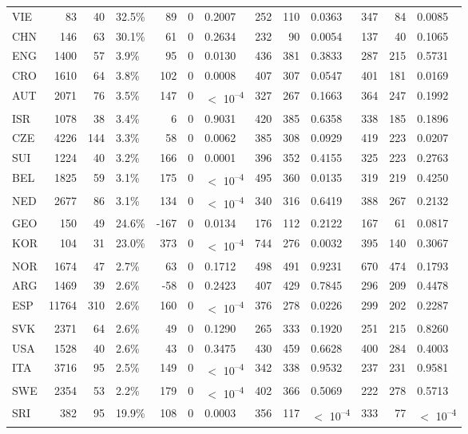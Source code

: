 \begin{tabular}[t]{lrrlrrlrrlrrl}
VIE & 83 & 40 & 32.5\% & 89 & 0 & 0.2007 & 252 & 110 & 0.0363 & 347 & 84 & 0.0085\\
CHN & 146 & 63 & 30.1\% & 61 & 0 & 0.2634 & 232 & 90 & 0.0054 & 137 & 40 & 0.1065\\
ENG & 1400 & 57 & 3.9\% & 95 & 0 & 0.0130 & 436 & 381 & 0.3833 & 287 & 215 & 0.5731\\
CRO & 1610 & 64 & 3.8\% & 102 & 0 & 0.0008 & 407 & 307 & 0.0547 & 401 & 181 & 0.0169\\
AUT & 2071 & 76 & 3.5\% & 147 & 0 & $<$ 10\textsuperscript{--4} & 327 & 267 & 0.1663 & 364 & 247 & 0.1992\\
ISR & 1078 & 38 & 3.4\% & 6 & 0 & 0.9031 & 420 & 385 & 0.6358 & 338 & 185 & 0.1896\\
CZE & 4226 & 144 & 3.3\% & 58 & 0 & 0.0062 & 385 & 308 & 0.0929 & 419 & 223 & 0.0207\\
SUI & 1224 & 40 & 3.2\% & 166 & 0 & 0.0001 & 396 & 352 & 0.4155 & 325 & 223 & 0.2763\\
BEL & 1825 & 59 & 3.1\% & 175 & 0 & $<$ 10\textsuperscript{--4} & 495 & 360 & 0.0135 & 319 & 219 & 0.4250\\
NED & 2677 & 86 & 3.1\% & 134 & 0 & $<$ 10\textsuperscript{--4} & 340 & 316 & 0.6419 & 388 & 267 & 0.2132\\
GEO & 150 & 49 & 24.6\% & -167 & 0 & 0.0134 & 176 & 112 & 0.2122 & 167 & 61 & 0.0817\\
KOR & 104 & 31 & 23.0\% & 373 & 0 & $<$ 10\textsuperscript{--4} & 744 & 276 & 0.0032 & 395 & 140 & 0.3067\\
NOR & 1674 & 47 & 2.7\% & 63 & 0 & 0.1712 & 498 & 491 & 0.9231 & 670 & 474 & 0.1793\\
ARG & 1469 & 39 & 2.6\% & -58 & 0 & 0.2423 & 407 & 429 & 0.7845 & 296 & 209 & 0.4478\\
ESP & 11764 & 310 & 2.6\% & 160 & 0 & $<$ 10\textsuperscript{--4} & 376 & 278 & 0.0226 & 299 & 202 & 0.2287\\
SVK & 2371 & 64 & 2.6\% & 49 & 0 & 0.1290 & 265 & 333 & 0.1920 & 251 & 215 & 0.8260\\
USA & 1528 & 40 & 2.6\% & 43 & 0 & 0.3475 & 430 & 459 & 0.6628 & 400 & 284 & 0.4003\\
ITA & 3716 & 95 & 2.5\% & 149 & 0 & $<$ 10\textsuperscript{--4} & 342 & 338 & 0.9532 & 237 & 231 & 0.9581\\
SWE & 2354 & 53 & 2.2\% & 179 & 0 & $<$ 10\textsuperscript{--4} & 402 & 366 & 0.5069 & 222 & 278 & 0.5713\\
SRI & 382 & 95 & 19.9\% & 108 & 0 & 0.0003 & 356 & 117 & $<$ 10\textsuperscript{--4} & 333 & 77 & $<$ 10\textsuperscript{--4}\\

\end{tabular}
